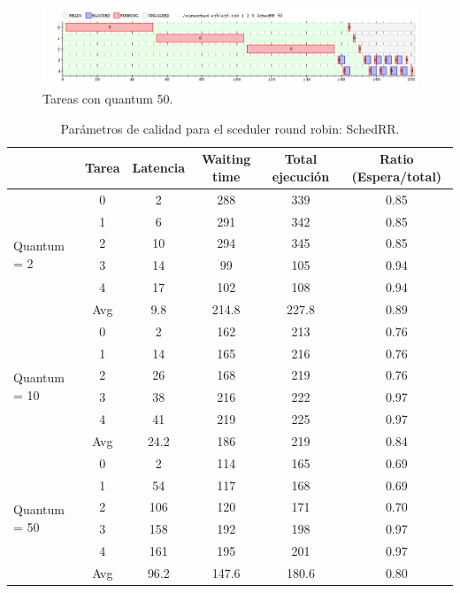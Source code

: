 \begin{figure}[h]
  \includegraphics[width=\textwidth]{../ej5/ej5RR12050.png}
  \caption{Tareas con quantum 50.}
\end{figure}















 \begin{table}[h!]
 	\begin{center}
 		\caption{Parámetros de calidad para el sceduler round robin: SchedRR.}
 		\label{tab:table1}
 		\begin{tabular}{|l|c|c|c|c|c|}
 			\hline
 			& Tarea & Latencia & Waiting time & Total ejecución & Ratio (Espera/total) \\
 			\hline
 			\hline
 			\multirow{6}{*}{Quantum = 2}
 			& 0 & 2 & 288 & 339 & 0.85\\ \cline{2-6}
 			& 1 & 6 & 291 & 342 & 0.85 \\ \cline{2-6}
 			& 2 & 10 & 294 & 345 & 0.85 \\ \cline{2-6}
 			& 3 & 14 & 99 & 105 & 0.94 \\ \cline{2-6}
 			& 4 & 17 & 102 & 108 & 0.94 \\ \cline{2-6}
 			& Avg & 9.8 & 214.8 & 227.8 & 0.89 \\
 			\hline
 			\hline
 			\multirow{6}{*}{Quantum = 10}
 			& 0 & 2 & 162 & 213 & 0.76 \\ \cline{2-6}
 			& 1 & 14 & 165 & 216 & 0.76 \\ \cline{2-6}
			& 2 & 26 & 168 & 219 & 0.76 \\ \cline{2-6}
 			& 3 & 38 & 216 & 222 & 0.97 \\ \cline{2-6}
 			& 4 & 41 & 219 & 225 & 0.97 \\ \cline{2-6}
 			& Avg & 24.2 & 186 & 219 & 0.84 \\
 			\hline
 			\hline
 			\multirow{6}{*}{Quantum = 50}
 			& 0 & 2 & 114 & 165 & 0.69 \\ \cline{2-6}
 			& 1 & 54 & 117 & 168 & 0.69 \\ \cline{2-6}
			& 2 & 106 & 120 & 171 & 0.70\\ \cline{2-6}
 			& 3 & 158 & 192 & 198 & 0.97 \\ \cline{2-6}
 			& 4 & 161 & 195 & 201 & 0.97 \\ \cline{2-6}
 			& Avg & 96.2 & 147.6 & 180.6 & 0.80 \\
 			\hline
 		\end{tabular}
 	\end{center}
 \end{table}


\clearpage   %
